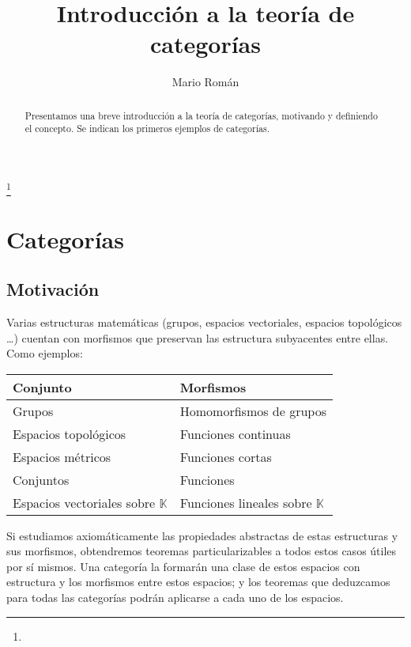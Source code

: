 \documentclass[a4paper, 11pt]{amsart}
\theoremstyle{definition}
\theoremstyle{remark}
\numberwithin{equation}{section}
\begin{document}
\title{Introducción a la teoría de categorías}


\author{Mario Román}
\address{}
\curraddr{}
\email{}
\thanks{}


\keywords{}

\date{}

\dedicatory{}

\begin{abstract}
  Presentamos una breve introducción a la teoría de categorías, motivando y definiendo el concepto.
  Se indican los primeros ejemplos de categorías.
\end{abstract}

\maketitle

\section {Categorías}
  \subsection {Motivación}
    Varias estructuras matemáticas (grupos, espacios vectoriales, espacios topológicos \dots) cuentan
    con morfismos que preservan las estructura subyacentes entre ellas. Como ejemplos:
    \begin {center}
    \begin{tabular}{l|l}
      Conjunto & Morfismos \\
      \hline
      Grupos & Homomorfismos de grupos \\
      Espacios topológicos & Funciones continuas \\
      Espacios métricos & Funciones cortas \\
      Conjuntos & Funciones \\
      Espacios vectoriales sobre $\mathbb{K}$ & Funciones lineales sobre $\mathbb{K}$ \\
    \end{tabular}
    \end{center}
    Si estudiamos axiomáticamente las propiedades abstractas de estas estructuras y sus morfismos,
    obtendremos teoremas particularizables a todos estos casos útiles por sí mismos.
    Una categoría la formarán una clase de estos espacios con estructura y los morfismos entre estos
    espacios; y los teoremas que deduzcamos para todas las categorías podrán aplicarse a cada uno de
    los espacios.
    
\end{document}
